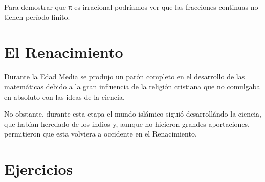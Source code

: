 \documentclass{apuntes}
\begin{document}
Para demostrar que π es irracional podríamos ver que las fracciones continuas no tienen período finito.

\chapter{El Renacimiento}
Durante la Edad Media se produjo un parón completo en el desarrollo de las matemáticas debido a la gran influencia de la religión cristiana que no comulgaba en absoluto con las ideas de la ciencia.

No obstante, durante esta etapa el mundo islámico siguió desarrollándo la ciencia, que habían heredado de los indios y, aunque no hicieron grandes aportaciones, permitieron que esta volviera a occidente en el Renacimiento.

\appendix
\chapter{Ejercicios}


\printindex
\end{document}
